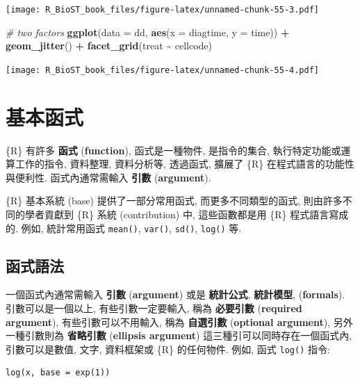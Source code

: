 \documentclass[
]{book}
\newenvironment{Shaded}{\begin{snugshade}}{\end{snugshade}}
\newcommand{\CommentTok}[1]{\textcolor[rgb]{0.56,0.35,0.01}{\textit{#1}}}
\newcommand{\DataTypeTok}[1]{\textcolor[rgb]{0.13,0.29,0.53}{#1}}
\newcommand{\KeywordTok}[1]{\textcolor[rgb]{0.13,0.29,0.53}{\textbf{#1}}}
\newcommand{\NormalTok}[1]{#1}
\newcommand{\OperatorTok}[1]{\textcolor[rgb]{0.81,0.36,0.00}{\textbf{#1}}}
\newcommand{\StringTok}[1]{\textcolor[rgb]{0.31,0.60,0.02}{#1}}
\begin{document}
\texttt{[image: R\_BioST\_book\_files/figure-latex/unnamed-chunk-55-3.pdf]}

\begin{Shaded}
\begin{Highlighting}[]
\CommentTok{\# two factors}
\KeywordTok{ggplot}\NormalTok{(}\DataTypeTok{data =}\NormalTok{ dd, }\KeywordTok{aes}\NormalTok{(}\DataTypeTok{x =}\NormalTok{ diagtime, }\DataTypeTok{y =}\NormalTok{ time)) }\OperatorTok{+}\StringTok{ }\KeywordTok{geom\_jitter}\NormalTok{() }\OperatorTok{+}\StringTok{ }
\StringTok{  }\KeywordTok{facet\_grid}\NormalTok{(treat }\OperatorTok{\textasciitilde{}}\StringTok{ }\NormalTok{cellcode)}
\end{Highlighting}
\end{Shaded}

\texttt{[image: R\_BioST\_book\_files/figure-latex/unnamed-chunk-55-4.pdf]}

\hypertarget{ux57faux672cux51fdux5f0f}{%
\chapter{基本函式}\label{ux57faux672cux51fdux5f0f}}

\{R\} 有許多
\textbf{函式}
(\textbf{function}),
函式是一種物件, 是指令的集合,
執行特定功能或運算工作的指令, 資料整理, 資料分析等,
透過函式,
擴展了 \{R\} 在程式語言的功能性與便利性.
函式內通常需輸入
\textbf{引數}
(\textbf{argument}).

\{R\} 基本系統 (base) 提供了一部分常用函式,
而更多不同類型的函式,
則由許多不同的學者貢獻到
\{R\} 系統 (contribution) 中,
這些函數都是用 \{R\} 程式語言寫成的.
例如, 統計常用函式
\texttt{mean()}, \texttt{var()}, \texttt{sd()}, \texttt{log()} 等.

\hypertarget{ux51fdux5f0fux8a9eux6cd5}{%
\section{函式語法}\label{ux51fdux5f0fux8a9eux6cd5}}

一個函式內通常需輸入
\textbf{引數}
(\textbf{argument})
或是
\textbf{統計公式},
\textbf{統計模型},
(\textbf{formals}).
引數可以是一個以上,
有些引數一定要輸入,
稱為
\textbf{必要引數}
(\textbf{required argument}),
有些引數可以不用輸入,
稱為
\textbf{自選引數}
(\textbf{optional argument}),
另外一種引數則為
\textbf{省略引數}
(\textbf{ellipsis argument})
這三種引可以同時存在一個函式內,
引數可以是數值, 文字, 資料框架或 \{R\} 的任何物件.
例如, 函式 \texttt{log()} 指令:

\begin{verbatim}
log(x, base = exp(1))     
\end{verbatim}
\end{document}
